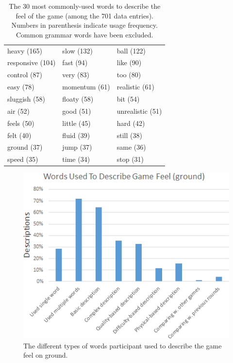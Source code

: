 \begin{table} \centering
\caption{The 30 most commonly-used words to describe the feel of the game (among the 701 data entries). Numbers in parenthesis indicate usage frequency. Common grammar words have been excluded.}
\label{table:mostWords}
\begin{tabular}{lll}
\toprule
heavy (165) & slow (132) & ball (122)\\
responsive (104) & fast (94) & like (90)\\
control (87) & very (83) & too (80)\\ 
easy (78) & momentum (61) & realistic (61)\\
sluggish (58) & floaty (58) & bit (54)\\
air  (52) & good (51) & unrealistic (51)\\
feels (50) & little (45) & hard (42)\\
felt (40) & fluid (39) & still (38)\\
ground (37) & jump (37) & same (36)\\
speed (35) & time (34) & stop (31)\\
\bottomrule
\end{tabular}
\end{table}

\begin{figure}[htbp]
\centering
\includegraphics[width=\columnwidth]{Pics/coding1}
\caption{The different types of words participant used to describe the game feel on ground.}
\label{fig:coding1}
\end{figure}

